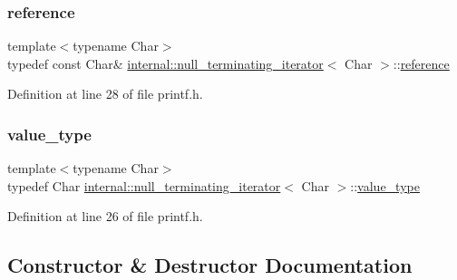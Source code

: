 \subsubsection{\texorpdfstring{reference}{reference}}
{\footnotesize\ttfamily template$<$typename Char$>$ \\
typedef const Char\& \hyperlink{classinternal_1_1null__terminating__iterator}{internal\+::null\+\_\+terminating\+\_\+iterator}$<$ Char $>$\+::\hyperlink{classinternal_1_1null__terminating__iterator_ae7aa95cd6c1413d74515a1dbcf21e040}{reference}}



Definition at line 28 of file printf.\+h.

\mbox{\label{classinternal_1_1null__terminating__iterator_a2c62d4a63a2a56950937b1971c306273}} 
\subsubsection{\texorpdfstring{value\+\_\+type}{value\_type}}
{\footnotesize\ttfamily template$<$typename Char$>$ \\
typedef Char \hyperlink{classinternal_1_1null__terminating__iterator}{internal\+::null\+\_\+terminating\+\_\+iterator}$<$ Char $>$\+::\hyperlink{classinternal_1_1null__terminating__iterator_a2c62d4a63a2a56950937b1971c306273}{value\+\_\+type}}



Definition at line 26 of file printf.\+h.



\subsection{Constructor \& Destructor Documentation}
\mbox{\label{classinternal_1_1null__terminating__iterator_a2c85bbc62dfa178fbe579df6933a70c4}} 
